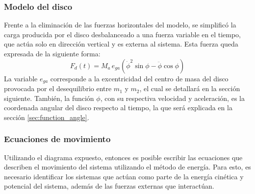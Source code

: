 \subsubsection{Modelo del disco}
Frente a la eliminación de las fuerzas horizontales del modelo, se simplificó la carga producida por el disco desbalanceado a una fuerza variable en el tiempo, que actúa solo en dirección vertical y es externa al sistema. Esta fuerza queda expresada de la siguiente forma:
\begin{equation}\label{eq:fza_gen}
	F_d(t) = M_a\, e_{ga}(\dot{\phi}^2 \sin\phi - \ddot{\phi} \cos\phi)
\end{equation}
La variable $e_{ga}$ corresponde a la excentricidad del centro de masa del disco provocada por el desequilibrio entre $m_1$ y $m_2$, el cual se detallará en la sección siguiente. También, la función $\phi$, con su respectiva velocidad y aceleración, es la coordenada angular del disco respecto al tiempo, la que será explicada en la sección \ref{sec:function_angle}.

\subsubsection{Ecuaciones de movimiento}
Utilizando el diagrama expuesto, entonces es posible escribir las ecuaciones que describen el movimiento del sistema utilizando el método de energía. Para esto, es necesario identificar los sistemas que actúan como parte de la energía cinética y potencial del sistema, además de las fuerzas externas que interactúan.

